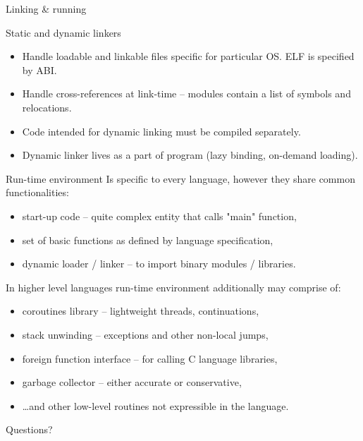 \documentclass[8pt]{beamer}
\begin{document}
\begin{frame}{Linking \& running}
  \begin{block}{Static and dynamic linkers}
    \begin{itemize}
      \item Handle loadable and linkable files specific for particular OS.
        ELF is specified by ABI.
      \item Handle cross-references at link-time -- modules contain a
        list of symbols and relocations.
      \item Code intended for dynamic linking must be compiled separately.
      \item Dynamic linker lives as a part of program (lazy binding, on-demand
        loading).
    \end{itemize}
  \end{block}

  \begin{block}{Run-time environment}
    Is specific to every language, however they share common functionalities:
    \begin{itemize}
      \item start-up code -- quite complex entity that calls "main" function,
      \item set of basic functions as defined by language specification,
      \item dynamic loader / linker -- to import binary modules / libraries.
    \end{itemize}
    In higher level languages run-time environment additionally may comprise of:
    \begin{itemize}
      \item coroutines library -- lightweight threads, continuations,
      \item stack unwinding -- exceptions and other non-local jumps,
      \item foreign function interface -- for calling C language libraries,
      \item garbage collector -- either accurate or conservative,
      \item \ldots and other low-level routines not expressible in the language.
    \end{itemize}
  \end{block}
\end{frame}

\begin{frame}{}
  \begin{center}
    {\Huge Questions?}
  \end{center}
\end{frame}
\end{document}
